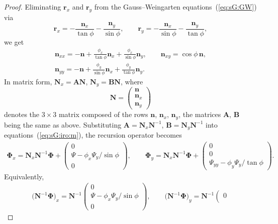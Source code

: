 \documentclass[10pt,a4paper]{amsart}
\def\eqref#1{{\rm(\ref{#1})}}
\let\ve\mathbf
\begin{document}
\begin{proof}
Eliminating $\ve r_x$ and $\ve r_y$ from the Gauss--Weingarten
equations~\eqref{eq:sG:GW} via
\[
\ve r_x = -\frac{\ve n_x}{\tan\phi} - \frac{\ve n_y}{\sin\phi},
\qquad
\ve r_y = -\frac{\ve n_x}{\sin\phi} - \frac{\ve n_y}{\tan\phi},
\]
we get
\begin{gather*}
\ve n_{xx} = -\ve n
 + \frac{\phi_x}{\tan \phi} \ve n_x
 + \frac{\phi_x}{\sin \phi} \ve n_y,
\qquad
\ve n_{xy} = \cos \phi\, \ve n,
\\
\ve n_{yy} = -\ve n
 + \frac{\phi_y}{\sin \phi} \ve n_x
 + \frac{\phi_y}{\tan \phi} \ve n_y.
\end{gather*}
In matrix form,
$
\mathbf N_{x}
 = \mathbf A \mathbf N$, $
\mathbf N_{y}
 = \mathbf B
\mathbf N$,
where
\[
\mathbf N = \left(\begin{matrix}
 \ve n \\ \ve n_{x} \\ \ve n_{y}
\end{matrix}\right)
\]
denotes the $3\times3$ matrix composed of the rows
$\ve n$, $\ve n_x$, $\ve n_y$,
the matrices $\mathbf A$, $\mathbf B$ being the same as above.
Substituting
$
\mathbf A = \mathbf N_x \mathbf N^{-1}$, $
\mathbf B = \mathbf N_y \mathbf N^{-1}
$
into equations~\eqref{eq:sG:iro:m}, the recursion operator becomes
\begin{gather*}
\mathbf \Phi_x
 = \mathbf N_x \mathbf N^{-1} \mathbf \Phi
+ \left(\begin{matrix}
 0 \\
 \Psi - \phi_x\Psi_y/{\sin\phi} \\
 0
\end{matrix}\right),
\qquad
\mathbf \Phi_y
 = \mathbf N_x \mathbf N^{-1} \mathbf \Phi
+ \left(\begin{matrix}
 0 \\
 0 \\
 \Psi_{yy} - \phi_y \Psi_y/{\tan\phi}
\end{matrix}\right).
\end{gather*}
Equivalently,
\begin{gather}
\bigl(\mathbf N^{-1} \mathbf \Phi\bigr)_x
 = \mathbf N^{-1} \left(\begin{matrix}
 0 \\
 \Psi - \phi_x\Psi_y/{\sin\phi} \\
 0
\end{matrix}\right),
\qquad
\bigl(\mathbf N^{-1} \mathbf \Phi\bigr)_y
 = \mathbf N^{-1} \left(\begin{matrix}
 0 \\

\end{matrix}
\end{gather}
\end{proof}
\end{document}
